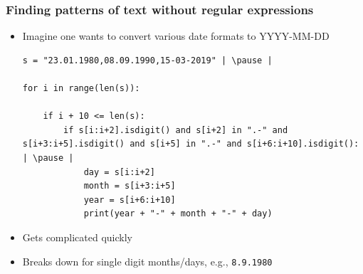 \documentclass[xcolor=table]{beamer}
\begin{document}
\begin{frame}[fragile]
\frametitle{Finding patterns of text without regular expressions}
    \begin{itemize}
        \item Imagine one wants to convert various date formats to YYYY-MM-DD \pause
\begin{lstlisting}[style=python]
s = "23.01.1980,08.09.1990,15-03-2019" | \pause |

for i in range(len(s)):

    if i + 10 <= len(s):
        if s[i:i+2].isdigit() and s[i+2] in ".-" and s[i+3:i+5].isdigit() and s[i+5] in ".-" and s[i+6:i+10].isdigit(): | \pause |
            day = s[i:i+2]
            month = s[i+3:i+5]
            year = s[i+6:i+10]
            print(year + "-" + month + "-" + day)
\end{lstlisting} \pause
\item Gets complicated quickly 
\item Breaks down for single digit months/days, e.g., \texttt{8.9.1980}
    \end{itemize}
\end{frame}
\end{document}
